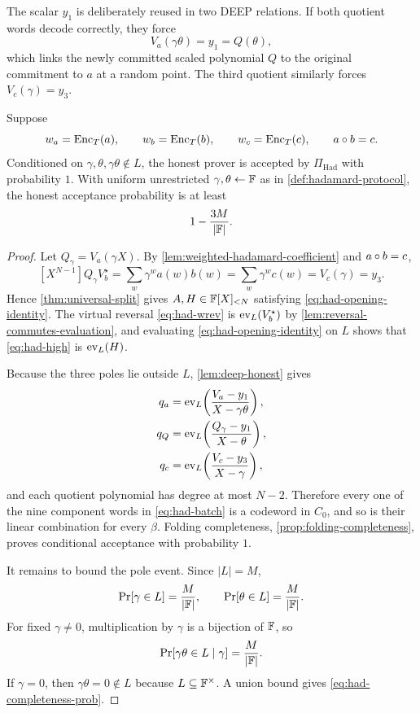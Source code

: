 The scalar $y_1$ is deliberately reused in two DEEP relations.  If both quotient words decode correctly, they force
\[
  V_a(\gamma\theta)=y_1=Q(\theta),
\]
which links the newly committed scaled polynomial $Q$ to the original commitment to $a$ at a random point.  The third quotient similarly forces $V_c(\gamma)=y_3$.

\begin{theorem}[Completeness]
\label{thm:had-completeness}
Suppose
\[
  w_a=\operatorname{Enc}_T(a),
  \qquad
  w_b=\operatorname{Enc}_T(b),
  \qquad
  w_c=\operatorname{Enc}_T(c),
  \qquad
  a\circ b=c.
\]
Conditioned on $\gamma,\theta,\gamma\theta\notin L$, the honest prover is accepted by $\Pi_{\mathrm{Had}}$ with probability $1$.  With uniform unrestricted $\gamma,\theta\leftarrow\mathbb{F}$ as in \cref{def:hadamard-protocol}, the honest acceptance probability is at least
\begin{equation}
  1-\frac{3M}{|\mathbb{F}|}.
  \label{eq:had-completeness-prob}
\end{equation}
\end{theorem}

\begin{proof}
Let $Q_\gamma=V_a(\gamma X)$.  By \cref{lem:weighted-hadamard-coefficient} and $a\circ b=c$,
\[
  [X^{N-1}]Q_\gamma V_b^{\star}
  =\sum_w\gamma^wa(w)b(w)
  =\sum_w\gamma^wc(w)
  =V_c(\gamma)=y_3.
\]
Hence \cref{thm:universal-split} gives $A,H\in\mathbb{F}[X]_{<N}$ satisfying \eqref{eq:had-opening-identity}.  The virtual reversal \eqref{eq:had-wrev} is $\operatorname{ev}_L(V_b^{\star})$ by \cref{lem:reversal-commutes-evaluation}, and evaluating \eqref{eq:had-opening-identity} on $L$ shows that \eqref{eq:had-high} is $\operatorname{ev}_L(H)$.

Because the three poles lie outside $L$, \cref{lem:deep-honest} gives
\begin{align*}
  q_a&=\operatorname{ev}_L\!\left(\frac{V_a-y_1}{X-\gamma\theta}\right),\\
  q_Q&=\operatorname{ev}_L\!\left(\frac{Q_\gamma-y_1}{X-\theta}\right),\\
  q_c&=\operatorname{ev}_L\!\left(\frac{V_c-y_3}{X-\gamma}\right),
\end{align*}
and each quotient polynomial has degree at most $N-2$.  Therefore every one of the nine component words in \eqref{eq:had-batch} is a codeword in $C_0$, and so is their linear combination for every $\beta$.  Folding completeness, \cref{prop:folding-completeness}, proves conditional acceptance with probability $1$.

It remains to bound the pole event.  Since $|L|=M$,
\[
  \Pr[\gamma\in L]=\frac{M}{|\mathbb{F}|},
  \qquad
  \Pr[\theta\in L]=\frac{M}{|\mathbb{F}|}.
\]
For fixed $\gamma\ne0$, multiplication by $\gamma$ is a bijection of $\mathbb{F}$, so
\[
  \Pr[\gamma\theta\in L\mid\gamma]=\frac{M}{|\mathbb{F}|}.
\]
If $\gamma=0$, then $\gamma\theta=0\notin L$ because $L\subseteq\mathbb{F}^\times$.  A union bound gives \eqref{eq:had-completeness-prob}.
\end{proof}

